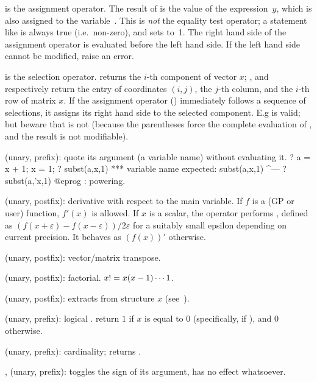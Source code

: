 %
\kbd{=} is the assignment operator. The result of  is the value
of the expression~$y$, which is also assigned to the variable~. This
is \emph{not} the equality test operator; a statement like  is
always true (i.e.~non-zero), and sets  to~1. The right hand side of
the assignment operator is evaluated before the left hand side. If the left
hand side cannot be modified, raise an error.

 \kbd{[ ]} is the selection operator. 
returns the $i$-th component of vector $x$; ,
 and  respectively return the entry of
coordinates $(i,j)$, the $j$-th column, and the $i$-th row of matrix $x$. If
the assignment operator (\kbd{=}) immediately follows a sequence of
selections, it assigns its right hand side to the selected component. E.g
 is valid; but beware that  is not
(because the parentheses force the complete evaluation of , and the
result is not modifiable).

%
 (unary, prefix): quote its argument (a variable name) without
evaluating it.
\bprog
? a = x + 1; x = 1;
? subst(a,x,1)
  ***   variable name expected: subst(a,x,1)
                                        ^---
? subst(a,'x,1)
@eprog
%
\kbd{\pow}: powering.

 (unary, postfix): derivative with respect to the main variable. If
$f$ is a (GP or user) function, $f'(x)$ is allowed. If $x$ is a scalar, the
operator performs , defined as $(f(x+\varepsilon) -
f(x-\varepsilon)) / 2\varepsilon$ for a suitably small epsilon depending on
current precision. It behaves as $(f(x))'$ otherwise.

\strut\kbd{\til} (unary, postfix): vector/matrix transpose.

\kbd{!} (unary, postfix): factorial. $x{\tt !}=x(x-1)\cdots 1$.

 (unary, postfix):  extracts
 from structure $x$ (see~).

%
\kbd{!} (unary, prefix): logical .  return $1$ if $x$ is
equal to $0$ (specifically, if ), and $0$ otherwise.

\kbd{\#} (unary, prefix): cardinality;  returns .

%
\kbd{+}, \kbd{-} (unary, prefix): \kbd{-} toggles the sign of its argument,
\kbd{+} has no effect whatsoever.

